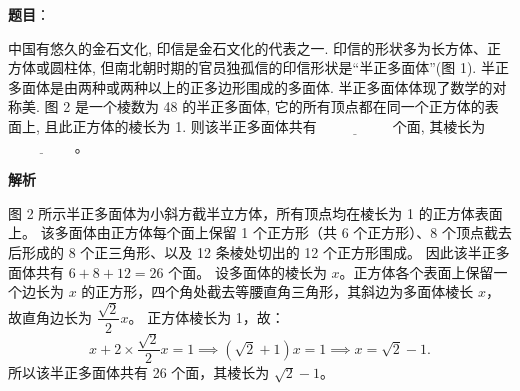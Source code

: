 \begin{answer}

\textbf{题目}：

中国有悠久的金石文化, 印信是金石文化的代表之一. 印信的形状多为长方体、正方体或圆柱体, 但南北朝时期的官员独孤信的印信形状是“半正多面体”(图 1). 半正多面体是由两种或两种以上的正多边形围成的多面体. 半正多面体体现了数学的对称美. 图 2 是一个棱数为 48 的半正多面体, 它的所有顶点都在同一个正方体的表面上, 且此正方体的棱长为 1. 则该半正多面体共有 $\underline{\hspace{2cm}}$ 个面, 其棱长为 $\underline{\hspace{2cm}}$。
\nopagebreak[4]
\begin{center}\end{center}
\nopagebreak[4]
\textbf{解析}

图 2 所示半正多面体为小斜方截半立方体，所有顶点均在棱长为 1 的正方体表面上。
该多面体由正方体每个面上保留 1 个正方形（共 6 个正方形）、8 个顶点截去后形成的 8 个正三角形、以及 12 条棱处切出的 12 个正方形围成。
因此该半正多面体共有 $6 + 8 + 12 = 26$ 个面。
设多面体的棱长为 $x$。正方体各个表面上保留一个边长为 $x$ 的正方形，四个角处截去等腰直角三角形，其斜边为多面体棱长 $x$，故直角边长为 $\dfrac{\sqrt{2}}{2}x$。
正方体棱长为 1，故：
\nopagebreak[4]
\[x + 2 \times \frac{\sqrt{2}}{2}x = 1 \implies (\sqrt{2} + 1)x = 1 \implies x = \sqrt{2} - 1.\]
所以该半正多面体共有 26 个面，其棱长为 $\sqrt{2} - 1$。


\par\medskip

\end{answer}

